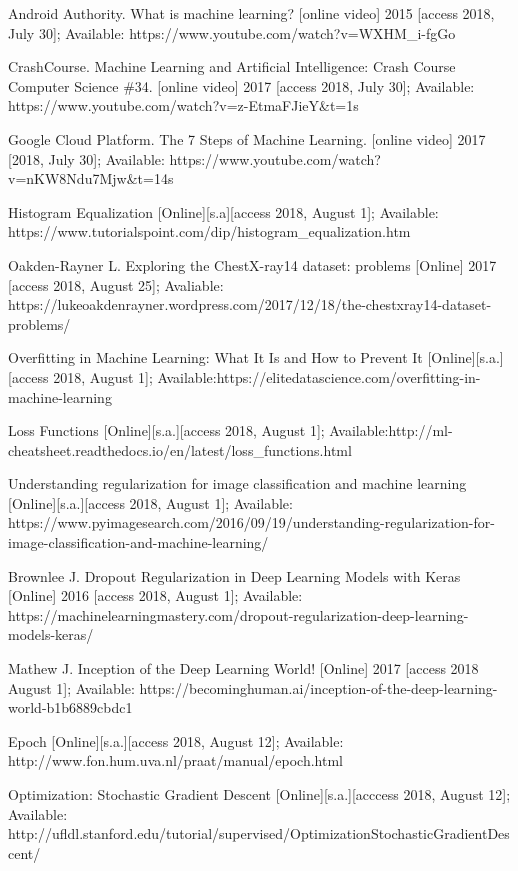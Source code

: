 \documentclass[15pt]{report}
\begin{document}
\begin{thebibliography}{cc}
 Android Authority. What is machine learning? [online video] 2015 [access 2018, July 30]; Available: https://www.youtube.com/watch?v=WXHM\_i-fgGo

 CrashCourse. Machine Learning and Artificial Intelligence: Crash Course Computer Science \#34. [online video] 2017 [access 2018, July 30]; Available: https://www.youtube.com/watch?v=z-EtmaFJieY\&t=1s

 Google Cloud Platform. The 7 Steps of Machine Learning. [online video] 2017 [2018, July 30]; Available: https://www.youtube.com/watch?v=nKW8Ndu7Mjw\&t=14s

 Histogram Equalization [Online][s.a][access 2018, August 1]; Available: https://www.tutorialspoint.com/dip/histogram\_equalization.htm

 Oakden-Rayner L. Exploring the ChestX-ray14 dataset: problems [Online] 2017 [access 2018, August 25]; Avaliable: https://lukeoakdenrayner.wordpress.com/2017/12/18/the-chestxray14-dataset-problems/

 Overfitting  in Machine Learning: What It Is and How to Prevent It [Online][s.a.][access 2018, August 1]; Available:https://elitedatascience.com/overfitting-in-machine-learning

 Loss Functions [Online][s.a.][access 2018, August 1]; Available:http://ml-cheatsheet.readthedocs.io/en/latest/loss\_functions.html

 Understanding regularization for image classification and machine learning [Online][s.a.][access 2018, August 1]; Available: https://www.pyimagesearch.com/2016/09/19/understanding-regularization-for-image-classification-and-machine-learning/

 Brownlee J. Dropout Regularization in Deep Learning Models with Keras [Online] 2016 [access 2018, August 1]; Available: https://machinelearningmastery.com/dropout-regularization-deep-learning-models-keras/

 Mathew J. Inception of the Deep Learning World! [Online] 2017 [access 2018 August 1]; Available: https://becominghuman.ai/inception-of-the-deep-learning-world-b1b6889cbdc1

 Epoch [Online][s.a.][access 2018, August 12]; Available: http://www.fon.hum.uva.nl/praat/manual/epoch.html

 Optimization: Stochastic Gradient Descent [Online][s.a.][acccess 2018, August 12]; Available: http://ufldl.stanford.edu/tutorial/supervised/OptimizationStochasticGradientDescent/


\end{thebibliography}
\end{document}
